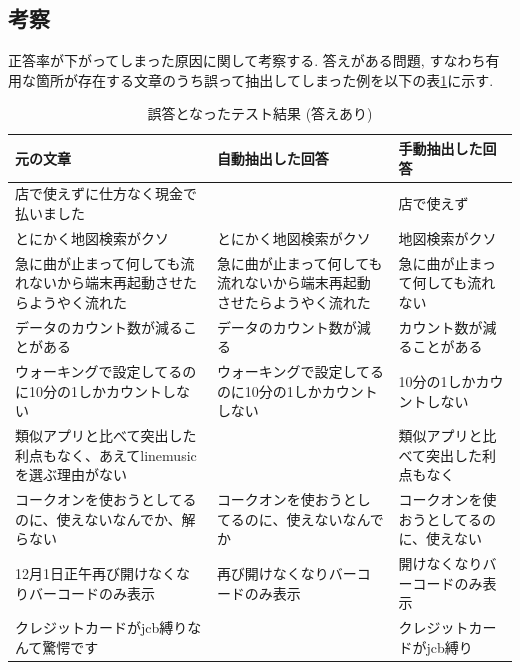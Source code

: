 \subsection{考察}
正答率が下がってしまった原因に関して考察する. 
答えがある問題, すなわち有用な箇所が存在する文章のうち誤って抽出してしまった例を以下の表\ref{tb:mistake}に示す.

\begin{table}[H]
  \caption{誤答となったテスト結果 (答えあり) }
  \small
  \label{tb:mistake}
  \begin{center}
  \begin{tabularx}{\linewidth}{X|X|X}
    \hline
    元の文章&自動抽出した回答&手動抽出した回答\\\hline\hline
    店で使えずに仕方なく現金で払いました&&店で使えず\\\hline
    とにかく地図検索がクソ&とにかく地図検索がクソ&地図検索がクソ\\\hline
    急に曲が止まって何しても流れないから端末再起動させたらようやく流れた&急に曲が止まって何しても流れないから端末再起動させたらようやく流れた&急に曲が止まって何しても流れない\\\hline
    データのカウント数が減ることがある&データのカウント数が減る&カウント数が減ることがある\\\hline
    ウォーキングで設定してるのに10分の1しかカウントしない&ウォーキングで設定してるのに10分の1しかカウントしない&10分の1しかカウントしない\\\hline
    類似アプリと比べて突出した利点もなく、あえてlinemusicを選ぶ理由がない&&類似アプリと比べて突出した利点もなく\\\hline
    コークオンを使おうとしてるのに、使えないなんでか、解らない&コークオンを使おうとしてるのに、使えないなんでか&コークオンを使おうとしてるのに、使えない\\\hline
    12月1日正午再び開けなくなりバーコードのみ表示&再び開けなくなりバーコードのみ表示&開けなくなりバーコードのみ表示\\\hline
    クレジットカードがjcb縛りなんて驚愕です&&クレジットカードがjcb縛り\\\hline
  \end{tabularx}\end{center}
\end{table}

